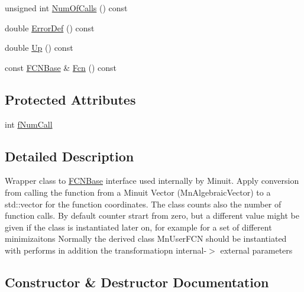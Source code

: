 \begin{DoxyCompactItemize}
\item 
unsigned int \mbox{\hyperlink{classROOT_1_1Minuit2_1_1MnFcn_af8dc896f10dc8a53429260198cd0e1c5}{Num\+Of\+Calls}} () const
\item 
double \mbox{\hyperlink{classROOT_1_1Minuit2_1_1MnFcn_abca32e4dd5ef187be7e099df14b4b54a}{Error\+Def}} () const
\item 
double \mbox{\hyperlink{classROOT_1_1Minuit2_1_1MnFcn_a2c91d0dd77e9c913116fb84b6fe31633}{Up}} () const
\item 
const \mbox{\hyperlink{classROOT_1_1Minuit2_1_1FCNBase}{F\+C\+N\+Base}} \& \mbox{\hyperlink{classROOT_1_1Minuit2_1_1MnFcn_a667fd993a6bb4832e6e70b7eaaca9fa4}{Fcn}} () const
\end{DoxyCompactItemize}
\subsection*{Protected Attributes}
\begin{DoxyCompactItemize}
\item 
int \mbox{\hyperlink{classROOT_1_1Minuit2_1_1MnFcn_a5a9224bf6024caf935f26488ed112e10}{f\+Num\+Call}}
\end{DoxyCompactItemize}


\subsection{Detailed Description}
Wrapper class to \mbox{\hyperlink{classROOT_1_1Minuit2_1_1FCNBase}{F\+C\+N\+Base}} interface used internally by Minuit. Apply conversion from calling the function from a Minuit Vector (Mn\+Algebraic\+Vector) to a std\+::vector for the function coordinates. The class counts also the number of function calls. By default counter strart from zero, but a different value might be given if the class is instantiated later on, for example for a set of different minimizaitons Normally the derived class Mn\+User\+F\+CN should be instantiated with performs in addition the transformatiopn internal-\/$>$ external parameters 

\subsection{Constructor \& Destructor Documentation}
\mbox{\label{classROOT_1_1Minuit2_1_1MnFcn_a882c5c26556515b2bbe0d07f50b32f4f}} 
